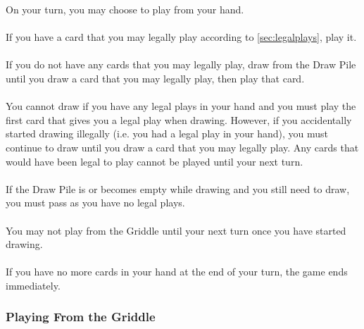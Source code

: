 \documentclass{article}
\begin{document}
On your turn, you may choose to play from your hand.

\paragraph{} \label{par:playifpossible}
If you have a card that you may legally play according to \autoref{sec:legalplays}, play it.

\paragraph{} \label{par:draw}
If you do not have any cards that you may legally play, draw from the Draw Pile until you draw a card that you may legally play, then play that card.

\paragraph{} \label{par:drawrestrictions}
You cannot draw if you have any legal plays in your hand and you must play the first card that gives you a legal play when drawing.
However, if you accidentally started drawing illegally (i.e. you had a legal play in your hand), you must continue to draw until you draw a card that you may legally play. Any cards that would have been legal to play cannot be played until your next turn.

\paragraph{} \label{par:emptydrawpile}
If the Draw Pile is or becomes empty while drawing and you still need to draw, you must pass as you have no legal plays.

\paragraph{} \label{par:drawnogriddle}
You may not play from the Griddle until your next turn once you have started drawing.

\paragraph{} \label{par:nocardterminate}
If you have no more cards in your hand at the end of your turn, the game ends immediately.

\subsubsection{Playing From the Griddle}
\label{sec:fromstack}
\end{document}
